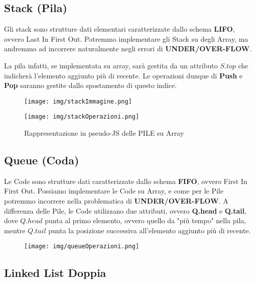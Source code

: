 \documentclass{article}
\begin{document}
\newpage

\subsection{Stack (Pila)}

Gli stack sono strutture dati elementari caratterizzate dallo schema \textbf{LIFO}, ovvero Last In First Out. Potremmo implementare gli Stack su degli Array, ma andremmo ad incorrere naturalmente negli errori di \textbf{UNDER/OVER-FLOW}.

La pila infatti, se implementata su array, sarà gestita da un attributo \(S.top\) che indicherà l'elemento aggiunto più di recente. Le operazioni dunque di \textbf{Push} e \textbf{Pop} saranno gestite dallo spostamento di questo indice.

\begin{figure}[htbp]
    \center
    \texttt{[image: img/stackImmagine.png]}
\end{figure}

\begin{figure}[htbp]
    \center
    \texttt{[image: img/stackOperazioni.png]}
    \caption{Rappresentazione in pseudo-JS delle PILE su Array}
\end{figure}

\newpage

\subsection{Queue (Coda)}

Le Code sono strutture dati caratterizzate dallo schema \textbf{FIFO}, ovvero First In First Out. Possiamo implementare le Code su Array, e come per le Pile potremmo incorrere nella problematica di \textbf{UNDER/OVER-FLOW}. A differenza delle Pile, le Code utilizzano due attributi, ovvero \textbf{Q.head} e \textbf{Q.tail}, dove \(Q.head\) punta al primo elemento, ovvero quello da "più tempo" nella pila, mentre \(Q.tail\) punta la posizione successiva all'elemento aggiunto più di recente. 

\begin{figure}[htbp]
    \center
    \texttt{[image: img/queueOperazioni.png]}
\end{figure}

\newpage

\subsection{Linked List Doppia}
\end{document}
